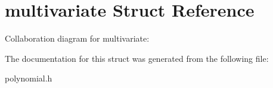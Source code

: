 \hypertarget{structmultivariate}{\section{multivariate Struct Reference}
\label{structmultivariate}
}


Collaboration diagram for multivariate\-:


The documentation for this struct was generated from the following file\-:\begin{DoxyCompactItemize}
\item 
polynomial.\-h\end{DoxyCompactItemize}
